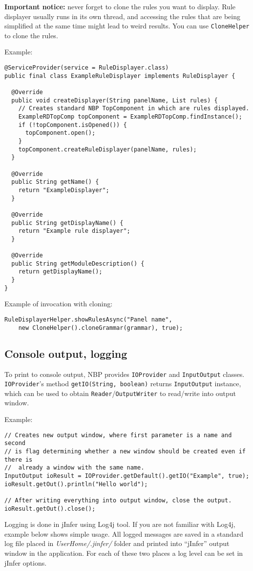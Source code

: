 \documentclass[a4paper,10pt,oneside]{article}
\begin{document}
\par \noindent
  \textbf{Important notice:} never forget to clone the rules you want
  to display. Rule displayer usually runs in its own thread, and accessing the
  rules that are being simplified at the same time might lead to weird results.
  You can use \texttt{CloneHelper} to clone the rules.


\noindent Example:
\begin{verbatim}
@ServiceProvider(service = RuleDisplayer.class)
public final class ExampleRuleDisplayer implements RuleDisplayer {

  @Override
  public void createDisplayer(String panelName, List rules) {
    // Creates standard NBP TopComponent in which are rules displayed.
    ExampleRDTopComp topComponent = ExampleRDTopComp.findInstance();
    if (!topComponent.isOpened()) {
      topComponent.open();
    }
    topComponent.createRuleDisplayer(panelName, rules);
  }

  @Override
  public String getName() {
    return "ExampleDisplayer";
  }

  @Override
  public String getDisplayName() {
    return "Example rule displayer";
  }

  @Override
  public String getModuleDescription() {
    return getDisplayName();
  }
}
\end{verbatim}
Example of invocation with cloning:
\begin{verbatim}
RuleDisplayerHelper.showRulesAsync("Panel name",
    new CloneHelper().cloneGrammar(grammar), true);
\end{verbatim}

\subsection*{Console output, logging}

\par 
  To print to console output, NBP provides
  \texttt{IOProvider}
  and \texttt{InputOutput}
  classes. \texttt{IOProvider}'s method \texttt{getIO(String, boolean)}
  returns \texttt{InputOutput} instance, which can be used to obtain
  \texttt{Reader}/\texttt{OutputWriter} to read/write into output window.

\noindent Example:
\begin{verbatim}
// Creates new output window, where first parameter is a name and second
// is flag determining whether a new window should be created even if there is
//  already a window with the same name.
InputOutput ioResult = IOProvider.getDefault().getIO("Example", true);
ioResult.getOut().println("Hello world");

// After writing everything into output window, close the output.
ioResult.getOut().close();
\end{verbatim}
  Logging is done in jInfer using
  Log4j tool.
  If you are not familiar with Log4j, example below shows simple usage. All
  logged messages are saved in a standard log file placed in \textit{UserHome/.jinfer/}
  folder and printed into ``jInfer'' output window in the application. For each
  of these two places a log level can be set in jInfer options.
\end{document}
